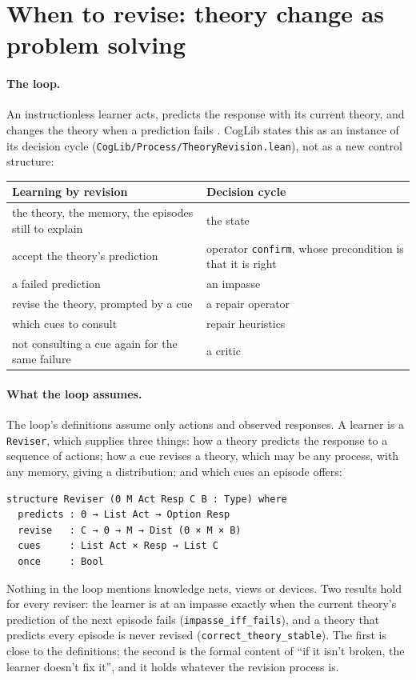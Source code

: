 \documentclass[11pt]{article}
\newcommand{\code}[1]{\texttt{#1}}
\newcommand{\lean}[1]{\texttt{#1}}
\begin{document}
\section{When to revise: theory change as problem solving}
\label{sec:revise}

\paragraph{The loop.} An instructionless learner acts, predicts the response with its current theory, and changes the theory when a prediction fails \citep{shrager1986,shrager1987}. CogLib states this as an instance of its decision cycle (\code{CogLib/Process/TheoryRevision.lean}), not as a new control structure:

\begin{center}
\small
\begin{tabularx}{\linewidth}{@{}>{\raggedright\arraybackslash}X>{\raggedright\arraybackslash}X@{}}
\toprule
Learning by revision & Decision cycle \\
\midrule
the theory, the memory, the episodes still to explain & the state \\
accept the theory's prediction & operator \code{confirm}, whose precondition is that it is right \\
a failed prediction & an impasse \\
revise the theory, prompted by a cue & a repair operator \\
which cues to consult & repair heuristics \\
not consulting a cue again for the same failure & a critic \\
\bottomrule
\end{tabularx}
\end{center}

\paragraph{What the loop assumes.} The loop's definitions assume only actions and observed responses. A learner is a \code{Reviser}, which supplies three things: how a theory predicts the response to a sequence of actions; how a cue revises a theory, which may be any process, with any memory, giving a distribution; and which cues an episode offers:
\begin{Verbatim}[fontsize=\small]
structure Reviser (Θ M Act Resp C B : Type) where
  predicts : Θ → List Act → Option Resp
  revise   : C → Θ → M → Dist (Θ × M × B)
  cues     : List Act × Resp → List C
  once     : Bool
\end{Verbatim}
Nothing in the loop mentions knowledge nets, views or devices. Two results hold for every reviser: the learner is at an impasse exactly when the current theory's prediction of the next episode fails (\lean{impasse\_iff\_fails}), and a theory that predicts every episode is never revised (\lean{correct\_theory\_stable}). The first is close to the definitions; the second is the formal content of ``if it isn't broken, the learner doesn't fix it'', and it holds whatever the revision process is.
\end{document}
